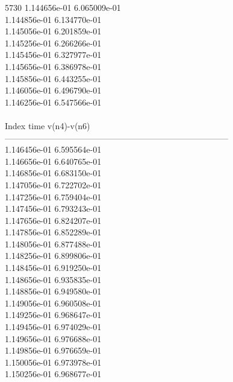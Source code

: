 5730	1.144656e-01	6.065009e-01	\\ 	1.144856e-01	6.134770e-01	\\ 	1.145056e-01	6.201859e-01	\\ 	1.145256e-01	6.266266e-01	\\ 	1.145456e-01	6.327977e-01	\\ 	1.145656e-01	6.386978e-01	\\ 	1.145856e-01	6.443255e-01	\\ 	1.146056e-01	6.496790e-01	\\ 	1.146256e-01	6.547566e-01	\\ \hline
\\ \hline
Index   time            v(n4)-v(n6)     \\ \hline
--------------------------------------------------------------------------------\\ 	1.146456e-01	6.595564e-01	\\ 	1.146656e-01	6.640765e-01	\\ 	1.146856e-01	6.683150e-01	\\ 	1.147056e-01	6.722702e-01	\\ 	1.147256e-01	6.759404e-01	\\ 	1.147456e-01	6.793243e-01	\\ 	1.147656e-01	6.824207e-01	\\ 	1.147856e-01	6.852289e-01	\\ 	1.148056e-01	6.877488e-01	\\ 	1.148256e-01	6.899806e-01	\\ 	1.148456e-01	6.919250e-01	\\ 	1.148656e-01	6.935835e-01	\\ 	1.148856e-01	6.949580e-01	\\ 	1.149056e-01	6.960508e-01	\\ 	1.149256e-01	6.968647e-01	\\ 	1.149456e-01	6.974029e-01	\\ 	1.149656e-01	6.976688e-01	\\ 	1.149856e-01	6.976659e-01	\\ 	1.150056e-01	6.973978e-01	\\ 	1.150256e-01	6.968677e-01	\\ \hline
